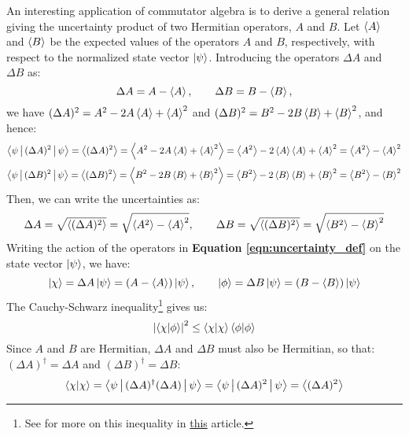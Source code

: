 An interesting application of commutator algebra is to derive a general relation giving the uncertainty product of two Hermitian operators, $A$ and $B$. Let $\left\langle A\right\rangle$ and $\left\langle B\right\rangle$ be the expected values of the operators $A$ and $B$, respectively, with respect to the normalized state vector $\ket{\psi}$. Introducing the operators $\Delta A$ and $\Delta B$ as:
\begin{equation} \label{eqn:uncertainty_def}
    \Delta A = A - \left\langle A\right\rangle, \qquad \Delta B = B - \left\langle B\right\rangle,
\end{equation}
we have $(\Delta A)^2 = A^2 - 2A\left\langle A\right\rangle + \left\langle A\right\rangle^2$ and $(\Delta B)^2 = B^2 - 2B\left\langle B\right\rangle + \left\langle B\right\rangle^2$, and hence:
\begin{equation}
    \Braket{\psi|(\Delta A)^2|\psi} = \left\langle(\Delta A)^2\right\rangle = \left\langle A^2 - 2A\left\langle A\right\rangle + \left\langle A\right\rangle^2\right\rangle = \left\langle A^2\right\rangle - 2\left\langle A\right\rangle\left\langle A\right\rangle + \left\langle A\right\rangle^2 = \left\langle A^2\right\rangle - \left\langle A\right\rangle^2
\end{equation}
\begin{equation}
    \Braket{\psi|(\Delta B)^2|\psi} = \left\langle(\Delta B)^2\right\rangle = \left\langle B^2 - 2B\left\langle B\right\rangle + \left\langle B\right\rangle^2\right\rangle = \left\langle B^2\right\rangle - 2\left\langle B\right\rangle\left\langle B\right\rangle + \left\langle B\right\rangle^2 = \left\langle B^2\right\rangle - \left\langle B\right\rangle^2
\end{equation}
Then, we can write the uncertainties as:
\begin{equation}
    \Delta A = \sqrt{\left\langle(\Delta A)^2\right\rangle} = \sqrt{\left\langle A^2\right\rangle - \left\langle A\right\rangle^2}, \qquad \Delta B = \sqrt{\left\langle(\Delta B)^2\right\rangle} = \sqrt{\left\langle B^2\right\rangle - \left\langle B\right\rangle^2}
\end{equation}
Writing the action of the operators in \textbf{Equation \ref{eqn:uncertainty_def}} on the state vector $\ket{\psi}$, we have:
\begin{equation}
    \ket{\chi} = \Delta A\ket{\psi} = (A - \left\langle A\right\rangle)\ket{\psi}, \qquad \ket{\phi} = \Delta B\ket{\psi} = (B - \left\langle B\right\rangle)\ket{\psi}
\end{equation}
The Cauchy-Schwarz inequality\footnote{See for more on this inequality in \href{https://mathworld.wolfram.com/SchwarzsInequality.html}{this} article.} gives us:
\begin{equation}
    \left|\braket{\chi|\phi}\right|^2 \leq \braket{\chi|\chi}\braket{\phi|\phi}
\end{equation}
Since $A$ and $B$ are Hermitian, $\Delta A$ and $\Delta B$ must also be Hermitian, so that: $(\Delta A)^\dagger = \Delta A$ and $(\Delta B)^\dagger = \Delta B$:
\begin{equation}
    \braket{\chi|\chi} = \Braket{\psi|(\Delta A)^\dagger(\Delta A)|\psi} = \Braket{\psi|(\Delta A)^2|\psi} = \left\langle(\Delta A)^2\right\rangle
\end{equation}
